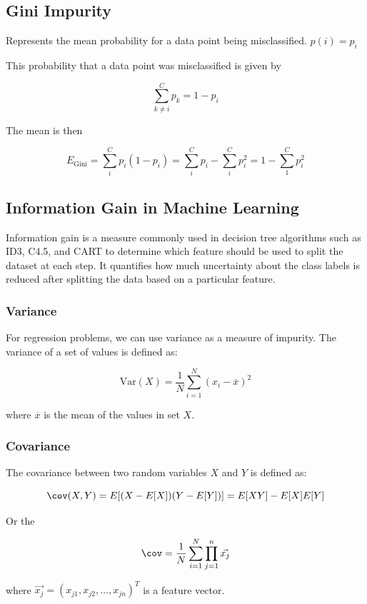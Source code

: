 \subsection{Gini Impurity}

Represents the mean probability for a data point being misclassified. \(p(i) = p_i\)

This probability that a data point was misclassified is given by

\[
    \sum_{k \ne i}^{C} p_k = 1 - p_i
\]

The mean is then 

\[
    E_{\text{Gini}}= \sum_{i}^{C}p_i (1 - p_i) = \sum_{i}^{C} p_i - \sum_{i}^{C} p_{i}^2 = 1 - \sum_{1}^{C} p_{i}^{2} 
\]

\subsection{Information Gain in Machine Learning}

Information gain is a measure commonly used in decision tree algorithms such as ID3, C4.5, 
and CART to determine which feature should be used to split the dataset 
at each step. It quantifies how much uncertainty about the class labels is reduced after 
splitting the data based on a particular feature.

\subsubsection{Variance}

For regression problems, we can use variance as a measure of impurity. The variance of a set of values is defined as:

\[
    \text{Var}(X) = \frac{1}{N} \sum_{i=1}^{N} (x_i - \overline{x})^2
\]

where \(\overline{x}\) is the mean of the values in set \(X\).

\subsubsection{Covariance}

The covariance between two random variables \(X\) and \(Y\) is defined as:

\[
    \cov(X, Y) = E[(X - E[X])(Y - E[Y])] = E[XY] - E[X]E[Y]
\]

Or the 

\[
    \cov = \frac{1}{N} \sum_{i=1}^{N} \prod_{j = 1}^{n} \vec{x_j}
\]

where \(\vec{x_j} = (x_{j1}, x_{j2}, \dots, x_{jn})^T\) is a feature vector.

